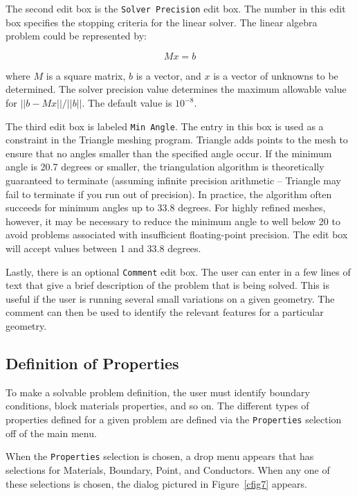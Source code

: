 The second edit box is the \texttt{Solver Precision} edit box. The
number in this edit box specifies the stopping criteria for the
linear solver. The linear algebra problem could be represented by:

\begin{equation}
M x = b
\end{equation}

\noindent
where $M$ is a square matrix, $b$ is a vector, and $x$ is a vector of
unknowns to be determined. The solver precision value determines the maximum
allowable value for $\vert \vert b - Mx\vert \vert / \vert \vert b\vert
\vert $. The default value is $10^{ - 8}$.

The third edit box is labeled {\tt Min Angle}.  The entry in this box is used as a
constraint in the Triangle meshing program.  Triangle adds points to the mesh to
ensure that no angles smaller than the specified angle occur. If the minimum angle
is 20.7 degrees or smaller, the triangulation algorithm is theoretically guaranteed to
terminate (assuming infinite precision arithmetic -- Triangle may
fail to terminate if you run out of precision).  In practice, the
algorithm often succeeds for minimum angles up to 33.8 degrees.
For highly refined meshes, however, it may be necessary to reduce
the minimum angle to well below 20 to avoid problems associated
with insufficient floating-point precision.  The edit box will accept
values between 1 and 33.8 degrees.

Lastly, there is an optional \texttt{Comment} edit box. The user
can enter in a few lines of text that give a brief description of
the problem that is being solved. This is useful if the user is
running several small variations on a given geometry. The comment
can then be used to identify the relevant features for a particular
geometry.

\subsection{Definition of Properties}

To make a solvable problem definition, the user must identify boundary
conditions, block materials properties, and so on. The different types of
properties defined for a given problem are defined via the
\texttt{Properties} selection off of the main menu.

When the \texttt{Properties} selection is chosen, a drop menu
appears that has selections for Materials, Boundary, Point, and
Conductors. When any one of these selections is chosen, the dialog
pictured in Figure~\ref{cfig7} appears.

